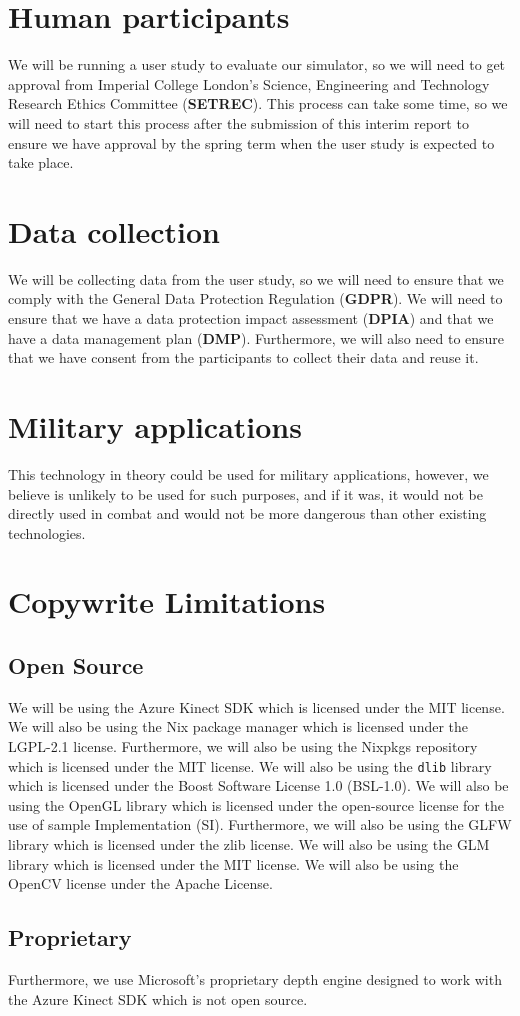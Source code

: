 \section{Human participants}
We will be running a user study to evaluate our simulator, so we will need to get approval from Imperial College London's Science, Engineering and Technology Research Ethics Committee (\textbf{SETREC}). This process can take some time, so we will need to start this process after the submission of this interim report to ensure we have approval by the spring term when the user study is expected to take place. 

\section{Data collection}
We will be collecting data from the user study, so we will need to ensure that we comply with the General Data Protection Regulation (\textbf{GDPR}). We will need to ensure that we have a data protection impact assessment (\textbf{DPIA}) and that we have a data management plan (\textbf{DMP}). Furthermore, we will also need to ensure that we have consent from the participants to collect their data and reuse it.

\section{Military applications}
This technology in theory could be used for military applications, however, we believe is unlikely to be used for such purposes, and if it was, it would not be directly used in combat and would not be more dangerous than other existing technologies.

\section{Copywrite Limitations}
\subsection{Open Source}
We will be using the Azure Kinect SDK which is licensed under the MIT license. We will also be using the Nix package manager which is licensed under the LGPL-2.1 license. Furthermore, we will also be using the Nixpkgs repository which is licensed under the MIT license. We will also be using the \texttt{dlib} library which is licensed under the Boost Software License 1.0 (BSL-1.0). We will also be using the OpenGL library which is licensed under the open-source license for the use of sample Implementation (SI). Furthermore, we will also be using the GLFW library which is licensed under the zlib license. We will also be using the GLM library which is licensed under the MIT license. We will also be using the OpenCV license under the Apache License. 
\subsection{Proprietary}
Furthermore, we use Microsoft's proprietary depth engine designed to work with the Azure Kinect SDK which is not open source.